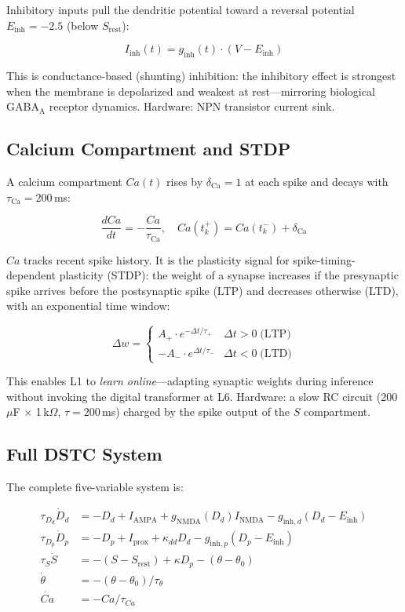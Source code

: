 \documentclass[12pt]{article}
\begin{document}
Inhibitory inputs pull the dendritic potential toward a reversal potential $E_{\text{inh}} = -2.5$ (below $S_{\text{rest}}$):

\[
I_{\text{inh}}(t) = g_{\text{inh}}(t) \cdot (V - E_{\text{inh}})
\]

This is conductance-based (shunting) inhibition: the inhibitory effect is strongest when the membrane is depolarized and weakest at rest---mirroring biological GABA$_\text{A}$ receptor dynamics. Hardware: NPN transistor current sink.

\subsection{Calcium Compartment and STDP}

A calcium compartment $Ca(t)$ rises by $\delta_{\text{Ca}} = 1$ at each spike and decays with $\tau_{\text{Ca}} = 200$\,ms:

\[
\frac{dCa}{dt} = -\frac{Ca}{\tau_{\text{Ca}}}, \quad Ca(t_k^+) = Ca(t_k^-) + \delta_{\text{Ca}}
\]

$Ca$ tracks recent spike history. It is the plasticity signal for spike-timing-dependent plasticity (STDP): the weight of a synapse increases if the presynaptic spike arrives before the postsynaptic spike (LTP) and decreases otherwise (LTD), with an exponential time window:

\[
\Delta w = \begin{cases}
A_+ \cdot e^{-\Delta t / \tau_+} & \Delta t > 0 \;\text{(LTP)} \\
-A_- \cdot e^{\Delta t / \tau_-} & \Delta t < 0 \;\text{(LTD)}
\end{cases}
\]

\noindent This enables L1 to \textit{learn online}---adapting synaptic weights during inference without invoking the digital transformer at L6. Hardware: a slow RC circuit (200\,$\mu$F $\times$ 1\,k$\Omega$, $\tau = 200$\,ms) charged by the spike output of the $S$ compartment.

\subsection{Full DSTC System}

The complete five-variable system is:

\begin{align}
\tau_{D_d} \dot{D}_d &= -D_d + I_{\text{AMPA}} + g_{\text{NMDA}}(D_d) I_{\text{NMDA}} - g_{\text{inh},d}(D_d - E_{\text{inh}}) \nonumber \\
\tau_{D_p} \dot{D}_p &= -D_p + I_{\text{prox}} + \kappa_{dd} D_d - g_{\text{inh},p}(D_p - E_{\text{inh}}) \nonumber \\
\tau_S \dot{S} &= -(S - S_{\text{rest}}) + \kappa D_p - (\theta - \theta_0) \nonumber \\
\dot{\theta} &= -(\theta - \theta_0)/\tau_\theta \nonumber \\
\dot{Ca} &= -Ca/\tau_{Ca} \nonumber
\end{align}
\end{document}
